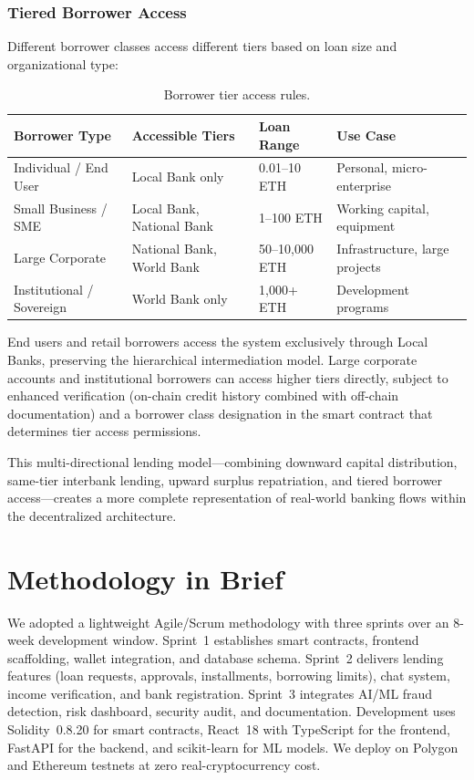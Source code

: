 \documentclass[12pt,a4paper]{report}
\newcommand{\tableheadfont}{\bfseries\small\color{PrimaryBlue}}
\newenvironment{moderntable}[1][H]{%
    \begin{table}[#1]\centering\small%
    \renewcommand{\arraystretch}{1.35}%
}{%
    \end{table}%
}
\begin{document}
\subsubsection{Tiered Borrower Access}

Different borrower classes access different tiers based on loan size and organizational type:

\begin{moderntable}
\caption{Borrower tier access rules.}
\begin{tabular}{@{} >{\raggedright}p{3cm} >{\raggedright}p{3.5cm} >{\raggedright}p{2.5cm} >{\raggedright\arraybackslash}p{3cm} @{}}
\toprule
\tableheadfont Borrower Type & \tableheadfont Accessible Tiers & \tableheadfont Loan Range & \tableheadfont Use Case \\
\midrule
\rowcolor{RowShade}
Individual / End User & Local Bank only & 0.01--10 ETH & Personal, micro-enterprise \\
Small Business / SME & Local Bank, National Bank & 1--100 ETH & Working capital, equipment \\
\rowcolor{RowShade}
Large Corporate & National Bank, World Bank & 50--10,000 ETH & Infrastructure, large projects \\
Institutional / Sovereign & World Bank only & 1,000+ ETH & Development programs \\
\bottomrule
\end{tabular}
\end{moderntable}

End users and retail borrowers access the system exclusively through Local Banks, preserving the hierarchical intermediation model. Large corporate accounts and institutional borrowers can access higher tiers directly, subject to enhanced verification (on-chain credit history combined with off-chain documentation) and a borrower class designation in the smart contract that determines tier access permissions.

This multi-directional lending model---combining downward capital distribution, same-tier interbank lending, upward surplus repatriation, and tiered borrower access---creates a more complete representation of real-world banking flows within the decentralized architecture.

\section{Methodology in Brief}

We adopted a lightweight Agile/Scrum methodology with three sprints over an 8-week development window. Sprint~1 establishes smart contracts, frontend scaffolding, wallet integration, and database schema. Sprint~2 delivers lending features (loan requests, approvals, installments, borrowing limits), chat system, income verification, and bank registration. Sprint~3 integrates AI/ML fraud detection, risk dashboard, security audit, and documentation. Development uses Solidity~0.8.20 for smart contracts, React~18 with TypeScript for the frontend, FastAPI for the backend, and scikit-learn for ML models. We deploy on Polygon and Ethereum testnets at zero real-cryptocurrency cost.
\end{document}
